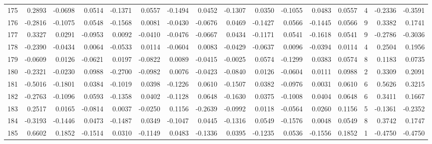 \begin{tabular}{lrrrrrrrrrrrrrrr}
175 &      0.2893 & -0.0698 &  0.0514 & -0.1371 &  0.0557 & -0.1494 &  0.0452 & -0.1307 &  0.0350 & -0.1055 &   0.0483 &     0.0557 &      4 &                   -0.2336 &                    -0.3591 \\
176 &     -0.2816 & -0.1075 &  0.0548 & -0.1568 &  0.0081 & -0.0430 & -0.0676 &  0.0469 & -0.1427 &  0.0566 &  -0.1445 &     0.0566 &      9 &                    0.3382 &                     0.1741 \\
177 &      0.3327 &  0.0291 & -0.0953 &  0.0092 & -0.0410 & -0.0476 & -0.0667 &  0.0434 & -0.1171 &  0.0541 &  -0.1618 &     0.0541 &      9 &                   -0.2786 &                    -0.3036 \\
178 &     -0.2390 & -0.0434 &  0.0064 & -0.0533 &  0.0114 & -0.0604 &  0.0083 & -0.0429 & -0.0637 &  0.0096 &  -0.0394 &     0.0114 &      4 &                    0.2504 &                     0.1956 \\
179 &     -0.0609 &  0.0126 & -0.0621 &  0.0197 & -0.0822 &  0.0089 & -0.0415 & -0.0025 &  0.0574 & -0.1299 &   0.0383 &     0.0574 &      8 &                    0.1183 &                     0.0735 \\
180 &     -0.2321 & -0.0230 &  0.0988 & -0.2700 & -0.0982 &  0.0076 & -0.0423 & -0.0840 &  0.0126 & -0.0604 &   0.0111 &     0.0988 &      2 &                    0.3309 &                     0.2091 \\
181 &     -0.5016 & -0.1801 &  0.0384 & -0.1019 &  0.0398 & -0.1226 &  0.0610 & -0.1507 &  0.0382 & -0.0976 &   0.0031 &     0.0610 &      6 &                    0.5626 &                     0.3215 \\
182 &     -0.2763 & -0.1096 &  0.0593 & -0.1358 &  0.0402 & -0.1128 &  0.0648 & -0.1630 &  0.0375 & -0.1008 &   0.0404 &     0.0648 &      6 &                    0.3411 &                     0.1667 \\
183 &      0.2517 &  0.0165 & -0.0814 &  0.0037 & -0.0250 &  0.1156 & -0.2639 & -0.0992 &  0.0118 & -0.0564 &   0.0260 &     0.1156 &      5 &                   -0.1361 &                    -0.2352 \\
184 &     -0.3193 & -0.1446 &  0.0473 & -0.1487 &  0.0349 & -0.1047 &  0.0445 & -0.1316 &  0.0549 & -0.1576 &   0.0048 &     0.0549 &      8 &                    0.3742 &                     0.1747 \\
185 &      0.6602 &  0.1852 & -0.1514 &  0.0310 & -0.1149 &  0.0483 & -0.1336 &  0.0395 & -0.1235 &  0.0536 &  -0.1556 &     0.1852 &      1 &                   -0.4750 &                    -0.4750 \\

\end{tabular}
